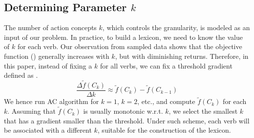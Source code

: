 \subsection{Determining Parameter $k$}
\label{sec:dpk}
The number of action concepts $k$, which controls the granularity,
is modeled as an input of our problem. In practice, to build a lexicon,
we need to know the value of $k$ for each verb. Our observation from
sampled data shows that the objective function () generally
increases with $k$, but with diminishing returns. Therefore, in this paper,
instead of fixing a $k$ for all verbs, we can fix a threshold gradient 
defined as .
\begin{equation}
\frac{\Delta \tilde{f}(C_k)}{\Delta k} \approx \tilde{f}(C_k)-\tilde{f}(C_{k-1})
\label{eq:gradient}
\end{equation}
We hence run AC algorithm for $k=1$, $k=2$,
etc., and compute $\tilde{f}(C_k)$ for each $k$.
Assuming that $\tilde{f}(C_k)$ is usually monotonic w.r.t. $k$,
we select the smallest $k$ that has a gradient smaller than the
threshold.  Under such scheme, each verb will be associated with
a different $k$, suitable for the construction of the lexicon.

